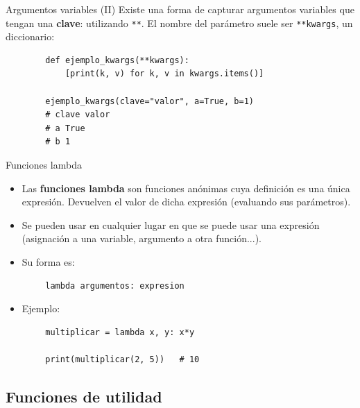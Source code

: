 \documentclass[10pt]{beamer} %
\begin{document}
\begin{frame}[fragile]{Argumentos variables (II)}
    Existe una forma de capturar argumentos variables que tengan una \textbf{clave}: utilizando \texttt{**}. El nombre del parámetro suele ser \texttt{**kwargs}, un diccionario:
    \begin{verbatim}
        def ejemplo_kwargs(**kwargs):
            [print(k, v) for k, v in kwargs.items()]
        
        ejemplo_kwargs(clave="valor", a=True, b=1)
        # clave valor
        # a True
        # b 1
    \end{verbatim}
\end{frame}

\begin{frame}[fragile]{Funciones lambda}
    \begin{itemize} 
        \item Las \textbf{funciones lambda} son funciones anónimas cuya definición es una única expresión. Devuelven el valor de dicha expresión (evaluando sus parámetros).
        \item Se pueden usar en cualquier lugar en que se puede usar una expresión (asignación a una variable, argumento a otra función...).
        \item Su forma es:
    \end{itemize}
    \begin{verbatim}
        lambda argumentos: expresion
    \end{verbatim}
    \begin{itemize}
        \item Ejemplo:
    \end{itemize}
    \begin{verbatim}
        multiplicar = lambda x, y: x*y
        
        print(multiplicar(2, 5))   # 10
    \end{verbatim}
\end{frame}

\subsection{Funciones de utilidad}
\end{document}
